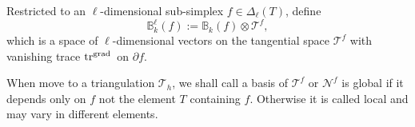 \documentclass[mathpazo]{cicp}
\newcommand{\Oplus}{\ensuremath{\vcenter{\hbox{\scalebox{1.5}{$\oplus$}}}}}
\begin{document}
%
Restricted to an $\ell$-dimensional sub-simplex $f\in \Delta_{\ell}(T)$,  define
$$ 
\mathbb B_{k}^{\ell}(f) := \mathbb B_k(f) \otimes \mathscr{T}^f,
$$ 
which is a space of $\ell$-dimensional vectors on the tangential space $\mathscr{T}^f$ with vanishing trace $\operatorname{tr}^{{\rm grad\,}}$ on $\partial f$. 


When move to a triangulation $\mathcal T_h$, we shall call a basis of $\mathscr T^f$ or $\mathscr N^f$ is global if it depends only on $f$ not the element $T$ containing $f$. Otherwise it is called local and may vary in different elements. 


\end{document}
